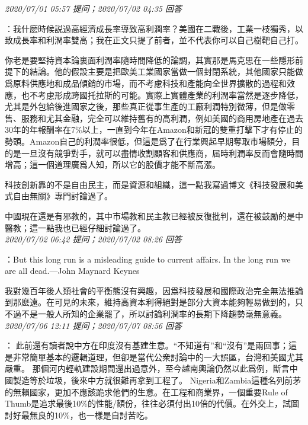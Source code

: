 \documentclass[twocolumn]{ctexart}
\begin{document}
\textit{\hfill\noindent\small 2020/07/01 05:57 提问；2020/07/02 04:35 回答}

：我什麽時候説過高經濟成長率導致高利潤率？美國在二戰後，工業一枝獨秀，以致成長率和利潤率雙高；我在正文只提了前者，並不代表你可以自己樹靶自己打。

你老是要堅持資本論裏面利潤率隨時間降低的論調，其實那是馬克思在一些隱形前提下的結論。他的假設主要是把歐美工業國家當做一個封閉系統，其他國家只能做爲原料供應地和成品傾銷的市場，而不考慮科技和產能向全世界擴散的過程和效應，也不考慮形成跨國托拉斯的可能。實際上實體產業的利潤率當然是逐步降低，尤其是外包給後進國家之後，那些真正從事生產的工廠利潤特別微薄，但是做零售、服務和尤其金融，完全可以維持舊有的高利潤，例如美國的商用房地產在過去30年的年報酬率在7\%以上，一直到今年在Amazon和新冠的雙重打擊下才有停止的勢頭。Amazon自己的利潤率很低，但這是爲了在行業興起早期奪取市場額分，目的是一旦沒有競爭對手，就可以盡情收割顧客和供應商，届時利潤率反而會隨時間增高；這一個道理廣爲人知，所以它的股價才能不斷高漲。

科技創新靠的不是自由民主，而是資源和組織，這一點我寫過博文《科技發展和美式自由無關》專門討論過了。

中國現在還是有邪教的，其中市場教和民主教已經被反復批判，還在被鼓勵的是中醫教；這一點我也已經仔細討論過了。
\\

\textit{\hfill\noindent\small 2020/07/02 06:42 提问；2020/07/02 08:26 回答}

：But this long run is a misleading guide to current affairs. In the long run we are all dead.---John Maynard Keynes

我對幾百年後人類社會的平衡態沒有興趣，因爲科技發展和國際政治完全無法推論到那麽遠。在可見的未來，維持高資本利得絕對是部分大資本能夠輕易做到的，只不過不是一般人所知的企業罷了，所以討論利潤率的長期下降趨勢毫無意義。
\\

\textit{\hfill\noindent\small 2020/07/06 12:11 提问；2020/07/07 08:56 回答}

：
此前還有讀者說中方在印度沒有基建生意。“不知道有”和“沒有”是兩回事；這是非常簡單基本的邏輯道理，但卻是當代公衆討論中的一大誤區，台灣和美國尤其嚴重。
那個河内輕軌建設期間還出過意外，至今越南輿論仍然以此爲例，斷言中國製造等於垃圾，後來中方就很難再拿到工程了。
Nigeria和Zambia這種名列前茅的無賴國家，更加不應該跪求他們的生意。在工程和商業界，一個重要Rule of Thumb是追求最後10\%的性能/額份，往往必須付出10倍的代價。在外交上，試圖討好最無良的10\%，也一樣是自討苦吃。
\\
\end{document}

